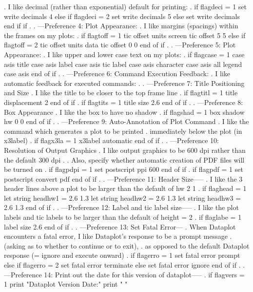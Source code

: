 .    I like decimal (rather than exponential) default for printing:
.
if flagdeci = 1
   set write decimals 4
else if flagdeci = 2
   set write decimals 5
else
   set write decimals
end if if
.
. ---Preference 4: Plot Appearance:
.    I like margins (spacings) within the frames on my plots:
.
if flagtoff = 1
   tic offset units screen
   tic offset 5 5
else if flagtoff = 2
   tic offset units data
   tic offset 0 0
end of if
.
. ---Preference 5: Plot Appearance:
.    I like upper and lower case text on my plots:
.
if flagcase = 1
   case asis
   title case asis
   label case asis
   tic label case asis
   character case asis all
   legend case asis
end of if
.
. ---Preference 6: Command Execution Feedback:
.    I like automatic feedback for executed commands:
.
. ---Preference 7: Title Positioning and Size
.    I like the title to be closer to the top frame line
.
if flagtitl = 1
   title displacement 2
end of if
.
if flagtits = 1
   title size 2.6
end of if
.
. ---Preference 8: Box Appearance
.    I like the box to have no shadow
.
if flagshad = 1
   box shadow hw 0 0
end of if
.
. ---Preference 9: Auto-Annotation of Plot Command
.    I like the command which generates a plot to be printed
.    immediately below the plot (in x3label)
.
if flagx3la = 1
   x3label automatic
end of if
.
. ---Preference 10: Resolution of Output Graphics
.    I like output graphics to be 600 dpi rather than the default 300 dpi
.
.    Also, specify whether automatic creation of PDF files will be turned on
.
if flagpdpi = 1
   set postscript ppi 600
end of if
.
if flagpdf = 1
   set postscript convert pdf
end of if
.
. ---Preference 11: Header Size-----
.    I like the 3 header lines above a plot to be larger than the default of     hw 2 1
.
if flaghead = 1
   let string headhw1 = 2.6 1.3
   let string headhw2 = 2.6 1.3
   let string headhw3 = 2.6 1.3
end of if
.
. ---Preference 12: Label and tic label size-----
.    I like the plot labels and tic labels to be larger than the default of    height = 2
.
if flaglabe = 1
   label size 2.6
end of if
.
. ---Preference 13: Set Fatal Error---
.    When Dataplot encounters a fatal error, I like Dataplot's response to be a prompt message
.    (asking as to whether to continue or to exit),
.    as opposed to the default Dataplot response (= ignore and execute onward)
.
if flagerro = 1
   set fatal error prompt
else if flagerro = 2
   set fatal error terminate
else
   set fatal error ignore
end of if
.
. ---Preference 14: Print out the date for this version of dataplot-----
.
if flagvers = 1
   print "Dataplot Version Date:"
   print " "
